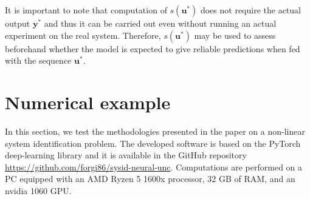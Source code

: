 \documentclass{ifacconf}
\newcommand{\tvec}[1]{{\mathbf{#1}}}
\begin{document}
It is important to note that computation of $s(\tvec{u}^*)$ does not require the actual output $\tvec{y}^*$ and thus it can be carried out even without running an actual experiment on the real system.
Therefore, $s(\tvec{u}^*)$ may be used to assess beforehand whether the model is expected to give reliable predictions when fed with the sequence $\tvec{u}^*$.



\section{Numerical example}
In this section, we test the methodologies presented in the paper on a non-linear system identification problem. %
The developed software is based on the PyTorch deep-learning library and it is available in the GitHub repository \url{https://github.com/forgi86/sysid-neural-unc}.
Computations are performed on a PC equipped with an AMD Ryzen 5 1600x processor, 32 GB of RAM, and an nvidia 1060 GPU.
\end{document}
